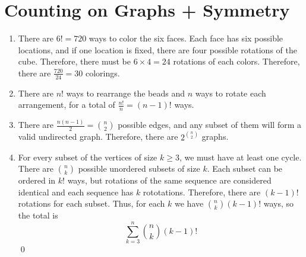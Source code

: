 \documentclass{article}
\begin{document}
	\section{Counting on Graphs + Symmetry}
	\begin{enumerate}[label=\alph*)]
		\item There are $6! = 720$ ways to color the six faces. Each face has six possible locations,
			and if one location is fixed, there are four possible rotations of the cube. Therefore,
			there must be $6 \times 4 = 24$ rotations of each colors. Therefore, there are
			$\frac{720}{24} = 30$ colorings.
		\item There are $n$! ways to rearrange the beads and $n$ ways to rotate each arrangement, for
			a total of $\frac{n!}{n} = (n-1)!$ ways.
		\item There are $\frac{n(n-1)}{2} = \binom{n}{2}$ possible edges, and any subset of them
			will form a valid undirected graph. Therefore, there are $2^{\binom{n}{2}}$ graphs.
		\item For every subset of the vertices of size $k \geq 3$, we must have at least one cycle.
			There are $\binom{n}{k}$ possible unordered subsets of size $k$. Each subset 
			can be ordered in $k!$ ways, but rotations of the same sequence are considered
			identical and each sequence has $k$ rototations. Therefore, there are $(k-1)!$
			rotations for each subset. Thus, for each $k$ we have $\binom{n}{k}(k-1)!$ ways, so
			the total is 
			\[\sum_{k=3}^n \binom{n}{k}(k-1)!\]
			\qed
	\end{enumerate}
\end{document}
